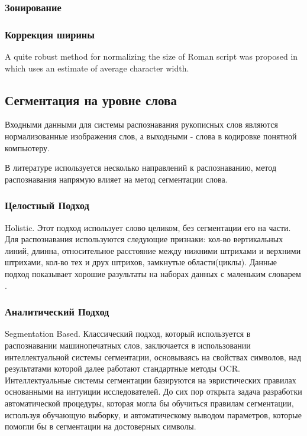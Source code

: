 \subsubsection{Зонирование}
\subsubsection{Коррекция ширины}

A quite robust method for normalizing the size of Roman script was proposed in \cite{madhvanath1999chaincode} which uses an estimate of average character width.

\subsection{Сегментация на уровне слова}

Входными данными для системы распознавания рукописных слов являются нормализованные изображения слов, а выходными - слова в кодировке понятной компьютеру.

В литературе используется несколько направлений к распознаванию, метод распознавания напрямую влияет на метод сегментации слова. 

\subsubsection{Целостный Подход}

Holistic. Этот подход использует слово целиком, без сегментации его на части. Для распознавания используются следующие признаки: кол-во вертикальных линий, длинна, относительное расстояние между нижними штрихами и верхними штрихами, кол-во тех и друх штрихов, замкнутые области(циклы). Данные подход показывает хорошие разультаты на наборах данных с маленьким словарем \cite{rehman2012off}.

\subsubsection{Аналитический Подход}

Segmentation Based. Классический подход, который используется в распознавании машинопечатных слов, заключается в использовании интеллектуальной системы сегментации, основываясь на свойствах символов, над результатами которой далее работают стандартные методы OCR. Интеллектуальные системы сегментации базируются на эвристических правилах основанными на интуиции исследователей. До сих пор открыта задача разработки автоматической процедуры, которая могла бы обучиться правилам сегментации, используя обучающую выборку, и автоматическому выводом параметров, которые помогли бы в сегментации на достоверных символы. \cite{bunke2003recognition}

